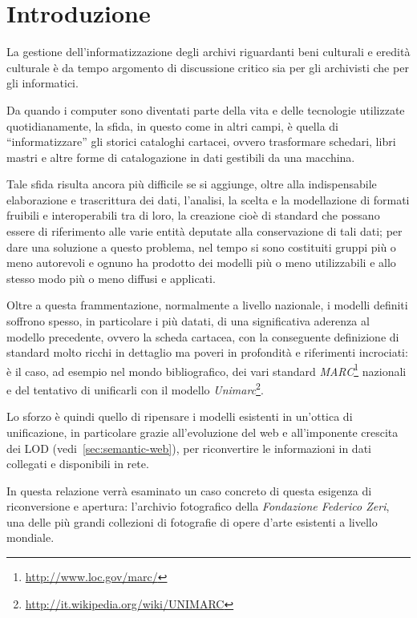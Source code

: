\chapter{Introduzione}

La gestione dell'informatizzazione degli archivi riguardanti beni culturali e eredità culturale è da tempo argomento di discussione critico sia per gli archivisti che per gli informatici.

Da quando i computer sono diventati parte della vita e delle tecnologie utilizzate quotidianamente, la sfida, in questo come in altri campi, è quella di ``informatizzare'' gli storici cataloghi cartacei, ovvero trasformare schedari, libri mastri e altre forme di catalogazione in dati gestibili da una macchina.

Tale sfida risulta ancora più difficile se si aggiunge, oltre alla indispensabile elaborazione e trascrittura dei dati, l'analisi, la scelta e la modellazione di formati fruibili e interoperabili tra di loro, la creazione cioè di standard che possano essere di riferimento alle varie entità deputate alla conservazione di tali dati; per dare una soluzione a questo problema, nel tempo si sono costituiti gruppi più o meno autorevoli e ognuno ha prodotto dei modelli più o meno utilizzabili e allo stesso modo più o meno diffusi e applicati.

Oltre a questa frammentazione, normalmente a livello nazionale, i modelli definiti soffrono spesso, in particolare i più datati, di una significativa aderenza al modello precedente, ovvero la scheda cartacea, con la conseguente definizione di standard molto ricchi in dettaglio ma poveri in profondità e riferimenti incrociati: è il caso, ad esempio nel mondo bibliografico, dei vari standard \emph{MARC}\footnote{\url{http://www.loc.gov/marc/}} nazionali e del tentativo di unificarli con il modello \emph{Unimarc}\footnote{\url{http://it.wikipedia.org/wiki/UNIMARC}}.

Lo sforzo è quindi quello di ripensare i modelli esistenti in un'ottica di unificazione, in particolare grazie all'evoluzione del web e all'imponente crescita dei LOD (vedi~\ref{sec:semantic-web}), per riconvertire le informazioni in dati collegati e disponibili in rete.

In questa relazione verrà esaminato un caso concreto di questa esigenza di riconversione e apertura: l'archivio fotografico della \emph{Fondazione Federico Zeri}, una delle più grandi collezioni di fotografie di opere d'arte esistenti a livello mondiale.

